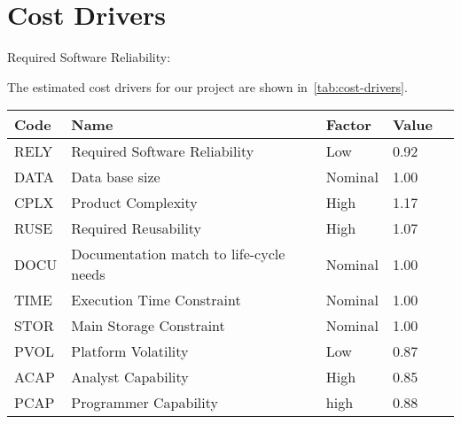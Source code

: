 \section{Cost Drivers}

\begin{description}

    \item[Required Software Reliability:]
\end{description}

The estimated cost drivers for our project are shown in~\autoref{tab:cost-drivers}.

\begin{table}[h]
    \centering
    \begin{tabular}{| l | l | l | l | l |}
        \hline
        \textbf{Code}   & \textbf{Name}                             & \textbf{Factor}   & \textbf{Value}    \\
        \hline
        RELY            & Required Software Reliability             & Low               & 0.92                 \\
        \hline
        DATA            & Data base size                            & Nominal           & 1.00                 \\
        \hline
        CPLX            & Product Complexity                        & High              & 1.17                \\
        \hline
        RUSE            & Required Reusability                      & High              & 1.07                 \\
        \hline
        DOCU            & Documentation match to life-cycle needs    & Nominal          & 1.00                \\
        \hline
        TIME            & Execution Time Constraint                 & Nominal           & 1.00                 \\
        \hline
        STOR            & Main Storage Constraint                   & Nominal           & 1.00                 \\
        \hline
        PVOL            & Platform Volatility                       & Low               & 0.87                 \\
        \hline
        ACAP            & Analyst Capability                        & High               & 0.85                 \\
        \hline
        PCAP            & Programmer Capability                     & high               & 0.88                 \\

\end{tabular}
\end{table}
